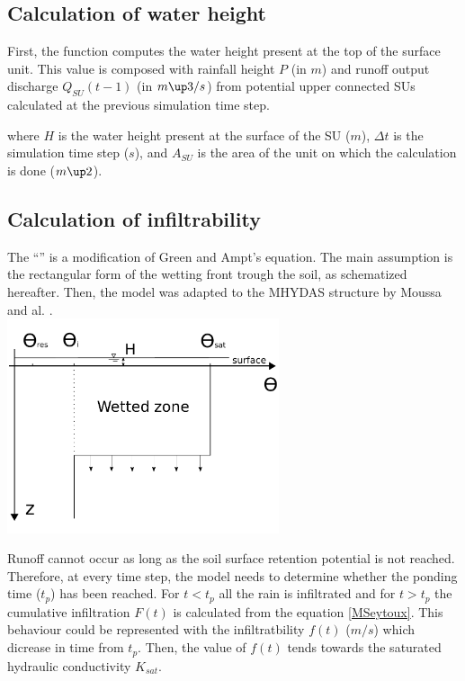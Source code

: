 \subsection{Calculation of water height}
First, the function computes the water height present at the top of the surface unit. This value is composed with rainfall height $P$ (in $m$) and runoff output discharge $Q_{SU}(t-1)$ (in $m\up3/s$) from potential upper connected SUs calculated at the previous simulation time step.



where $H$ is the water height present at the surface of the SU ($m$), $\Delta t$ is the simulation time step ($s$), and $A_{SU}$ is the area of the unit on which the calculation is done ($m\up2$).


\subsection{Calculation of infiltrability}
The ``\englishname'' \cite{MorelS1978} is a modification of Green and Ampt's \cite{Green1911} equation. The main assumption is the rectangular form of the wetting front trough the soil, as schematized hereafter. Then, the model was adapted to the MHYDAS structure by Moussa and al. \cite{Moussa2002}.\\

\includegraphics[width=8cm]{common/Green_Ampt_humidity.pdf}

Runoff cannot occur as long as the soil surface retention potential is not reached. Therefore, at every time step, the model needs to determine whether the ponding time ($t_p$) has been reached. For $t < t_p$ all the rain is infiltrated and for $t > t_p$ the cumulative infiltration $F(t)$ is calculated from the equation \ref{MSeytoux}. This behaviour could be represented with the infiltratbility $f(t)$ ($m/s$) which dicrease in time from $t_p$. Then, the value of $f(t)$ tends towards the saturated hydraulic conductivity $K_{sat}$.\\

